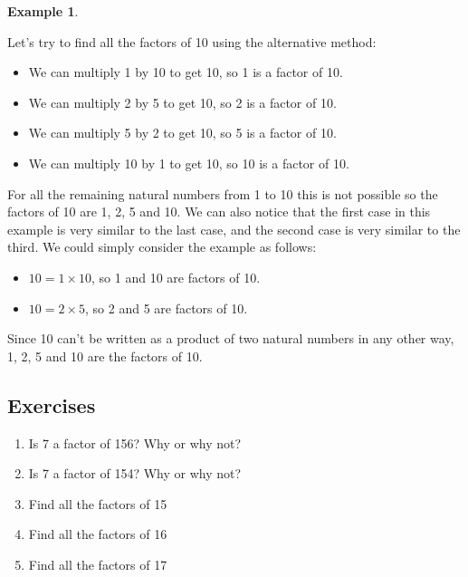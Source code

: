 \documentclass[11pt, oneside]{article}
\theoremstyle{definition}
\newtheorem{exmp}{Example}[section]
\begin{document}
\begin{exmp} \end{exmp}
Let's try to find all the factors of 10 using the alternative method: 
\begin{itemize}
\item We can multiply 1 by 10 to get 10, so 1 is a factor of 10.
\item We can multiply 2 by 5 to get 10, so 2 is a factor of 10.
\item We can multiply 5 by 2 to get 10, so 5 is a factor of 10.
\item We can multiply 10 by 1 to get 10, so 10 is a factor of 10.
\end{itemize}
For all the remaining natural numbers from 1 to 10 this is not possible so the factors of 10 are 1, 2, 5 and 10. We can also notice that the first case in this example is very similar to the last case, and the second case is very similar to the third. We could simply consider the example as follows:

\begin{itemize}
\item $10 = 1\times 10$, so 1 and 10 are factors of 10.
\item $10 = 2\times 5$, so 2  and 5 are factors of 10.
\end{itemize}
Since 10 can't be written as a product of two natural numbers in any other way, 1, 2, 5 and 10 are the factors of 10.

\bigbreak

\noindent{}


\subsection{Exercises}
\begin{enumerate}
\item Is 7 a factor of 156? Why or why not?
\item Is 7 a factor of 154? Why or why not?
\item Find all the factors of 15
\item Find all the factors of 16
\item Find all the factors of 17
\end{enumerate}
\end{document}
